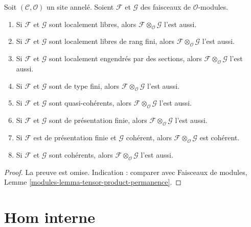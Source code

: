 \begin{lemma}
\label{lemma-tensor-product-permanence}
Soit $(\mathcal{C}, \mathcal{O})$ un site annelé.
Soient $\mathcal{F}$ et $\mathcal{G}$ des faisceaux de $\mathcal{O}$-modules.
\begin{enumerate}
\item Si $\mathcal{F}$ et $\mathcal{G}$ sont localement libres, alors
$\mathcal{F} \otimes_\mathcal{O} \mathcal{G}$ l'est aussi.
\item Si $\mathcal{F}$ et $\mathcal{G}$ sont localement libres de rang fini,
alors $\mathcal{F} \otimes_\mathcal{O} \mathcal{G}$ l'est aussi.
\item Si $\mathcal{F}$ et $\mathcal{G}$ sont localement engendrés par des
sections, alors $\mathcal{F} \otimes_\mathcal{O} \mathcal{G}$ l'est aussi.
\item Si $\mathcal{F}$ et $\mathcal{G}$ sont de type fini, alors
$\mathcal{F} \otimes_\mathcal{O} \mathcal{G}$ l'est aussi.
\item Si $\mathcal{F}$ et $\mathcal{G}$ sont quasi-cohérents, alors
$\mathcal{F} \otimes_\mathcal{O} \mathcal{G}$ l'est aussi.
\item Si $\mathcal{F}$ et $\mathcal{G}$ sont de présentation finie, alors
$\mathcal{F} \otimes_\mathcal{O} \mathcal{G}$ l'est aussi.
\item Si $\mathcal{F}$ est de présentation finie et $\mathcal{G}$ cohérent,
alors $\mathcal{F} \otimes_\mathcal{O} \mathcal{G}$ est cohérent.
\item Si $\mathcal{F}$ et $\mathcal{G}$ sont cohérents, alors
$\mathcal{F} \otimes_\mathcal{O} \mathcal{G}$ l'est aussi.
\end{enumerate}
\end{lemma}

\begin{proof}
La preuve est omise. Indication : comparer avec
Faisceaux de modules, Lemme \ref{modules-lemma-tensor-product-permanence}.
\end{proof}



\section{Hom interne}
\label{section-internal-hom}

